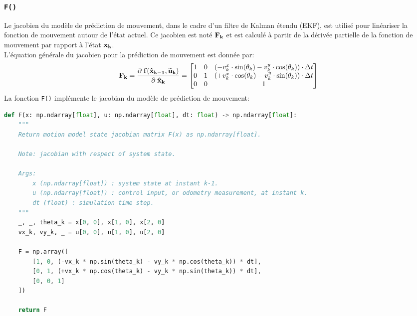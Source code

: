 \documentclass[../CSC_5RO12_TA_TP2.tex]{subfiles}
\begin{document}
\subsubsection{\texttt{F()}}
\begin{definition}
    Le jacobien du modèle de prédiction de mouvement, dans le cadre d'un filtre de Kalman étendu (EKF), est utilisé pour linéariser la fonction de mouvement autour de l'état actuel. Ce jacobien est noté $\bf{F}_{k}$ et est calculé à partir de la dérivée partielle de la fonction de mouvement par rapport à l'état $\bf{x}_{k}$.\\

    \noindent L'équation générale du jacobien pour la prédiction de mouvement est donnée par:
    \begin{equation}
        \bf{F}_{k} = \frac{\partial\;f(\hat{\bf{x}}_{k-1}, \widetilde{\bf{u}}_{k})}{\partial\;\hat{\bf{x}}_{k}} = \begin{bmatrix}
            1 & 0 & (-v^{x}_{k} \cdot \sin(\theta_{k}) - v^{y}_{k} \cdot \cos(\theta_{k})) \cdot \Delta t\\
            0 & 1 & (+v^{x}_{k} \cdot \cos(\theta_{k}) - v^{y}_{k} \cdot \sin(\theta_{k})) \cdot \Delta t\\
            0 & 0 & 1\\
        \end{bmatrix}
    \end{equation}
    La fonction \texttt{F()} implémente le jacobian du modèle de prédiction de mouvement:
    \begin{scriptsize}\mycode
        \begin{lstlisting}[language=Python, caption=\texttt{F()}]
def F(x: np.ndarray[float], u: np.ndarray[float], dt: float) -> np.ndarray[float]:
    """
    Return motion model state jacobian matrix F(x) as np.ndarray[float].

    Note: jacobian with respect of system state.

    Args:
        x (np.ndarray[float]) : system state at instant k-1.
        u (np.ndarray[float]) : control input, or odometry measurement, at instant k.
        dt (float) : simulation time step.
    """
    _, _, theta_k = x[0, 0], x[1, 0], x[2, 0]
    vx_k, vy_k, _ = u[0, 0], u[1, 0], u[2, 0]

    F = np.array([
        [1, 0, (-vx_k * np.sin(theta_k) - vy_k * np.cos(theta_k)) * dt],
        [0, 1, (+vx_k * np.cos(theta_k) - vy_k * np.sin(theta_k)) * dt],
        [0, 0, 1]
    ])

    return F
        \end{lstlisting}
    \end{scriptsize}
\end{definition}
\end{document}
